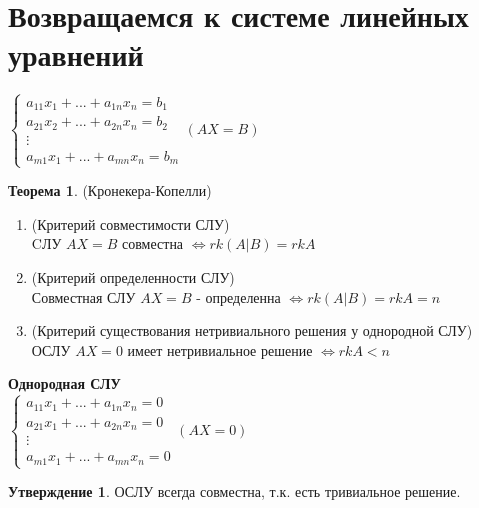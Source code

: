 \documentclass[a4paper, 12pt]{article}
\theoremstyle{definition}
\newtheorem*{theorem}{Теорема}
\newtheorem*{subtheorem}{Утверждение}
\begin{document}
  \section{Возвращаемся к системе линейных уравнений}
  $\begin{cases}
    a_{11}x_1 + ... + a_{1n}x_n = b_1 \\ 
    a_{21}x_2 + ... + a_{2n}x_n = b_2 \\
    \vdots \\
    a_{m1}x_1 + ... + a_{mn}x_n = b_m
  \end{cases} (AX = B)$
  \begin{theorem} (Кронекера-Копелли)
    \begin{enumerate}
      \item (Критерий совместимости СЛУ) \\ CЛУ $AX = B$ совместна $\Longleftrightarrow rk(A|B) = rkA$ 
      \item (Критерий определенности СЛУ) \\ Совместная СЛУ $AX =B$ - определенна $\Longleftrightarrow rk(A|B) = rkA = n$ 
      \item (Критерий существования нетривиального решения у однородной СЛУ) \\ ОСЛУ $AX = 0$ имеет нетривиальное решение $\Longleftrightarrow rkA<n$ 
    \end{enumerate}
  \end{theorem}
  \textbf{Однородная СЛУ} \\  
  $\begin{cases}
    a_{11}x_1 + ... + a_{1n}x_n = 0 \\ 
    a_{21}x_1 + ... + a_{2n}x_n = 0 \\
    \vdots \\
    a_{m1}x_1 + ... + a_{mn}x_n = 0
  \end{cases} (AX = 0)$
  \begin{subtheorem}
    ОСЛУ всегда совместна, т.к. есть тривиальное решение.
  \end{subtheorem} 
\end{document}
